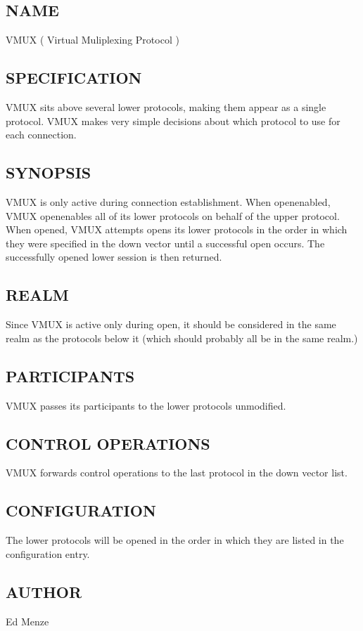 \subsection*{NAME}

\noindent VMUX ( Virtual Muliplexing Protocol )

\subsection*{SPECIFICATION}

VMUX sits above several lower protocols, making them appear as a
single protocol.  VMUX makes very simple decisions about which
protocol to use for each connection.

\subsection*{SYNOPSIS}

VMUX is only active during connection establishment.  When
openenabled, VMUX openenables all of its lower protocols on behalf of
the upper protocol.  When opened, VMUX attempts opens its lower
protocols in the order in which they were specified in the down vector
until a successful open occurs.  The successfully opened lower session
is then returned.

\subsection*{REALM}

Since VMUX is active only during open, it should be considered in the
same realm as the protocols below it (which should probably all be in
the same realm.)

\subsection*{PARTICIPANTS}

VMUX passes its participants to the lower protocols unmodified.

\subsection*{CONTROL OPERATIONS}

VMUX forwards control operations to the last protocol in the down
vector list.

\subsection*{CONFIGURATION}

The lower protocols will be opened in the order in which they are
listed in the configuration entry.

\subsection*{AUTHOR}

\noindent Ed Menze
